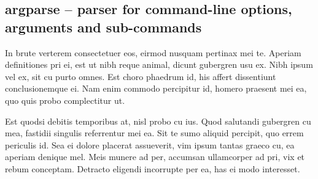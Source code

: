 \subsection{argparse -- parser for command-line options, arguments and sub-commands}
In brute verterem consectetuer eos, eirmod nusquam pertinax mei te. Aperiam definitiones pri ei, est ut nibh reque animal, dicunt gubergren usu ex. Nibh ipsum vel ex, sit cu purto omnes. Est choro phaedrum id, his affert dissentiunt conclusionemque ei. Nam enim commodo percipitur id, homero praesent mei ea, quo quis probo complectitur ut.

Est quodsi debitis temporibus at, nisl probo cu ius. Quod salutandi gubergren cu mea, fastidii singulis referrentur mei ea. Sit te sumo aliquid percipit, quo errem periculis id. Sea ei dolore placerat assueverit, vim ipsum tantas graeco cu, ea aperiam denique mel. Meis munere ad per, accumsan ullamcorper ad pri, vix et rebum conceptam. Detracto eligendi incorrupte per ea, has ei modo interesset.
